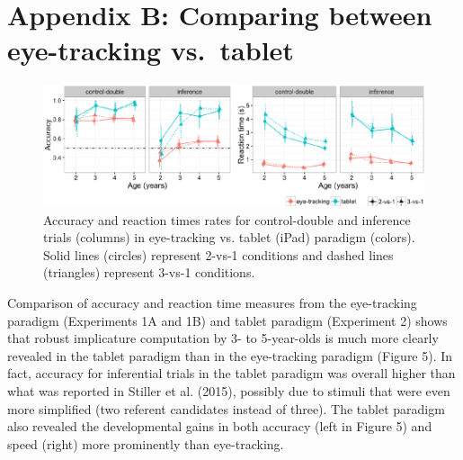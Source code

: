 \documentclass[a4paper,man,apacite,floatsintext]{apa6}
\newenvironment{CodeChunk}{}{}
\begin{document}
\section{Appendix B: Comparing between eye-tracking
vs.~tablet}\label{appendix-b-comparing-between-eye-tracking-vs.tablet}

\begin{CodeChunk}
\begin{figure}[H]

{\centering \includegraphics{figs/etip_compd-1} 

}

\caption[Accuracy and reaction times rates for control-double and inference trials (columns) in eye-tracking vs]{Accuracy and reaction times rates for control-double and inference trials (columns) in eye-tracking vs. tablet (iPad) paradigm (colors). Solid lines (circles) represent 2-vs-1 conditions and dashed lines (triangles) represent 3-vs-1 conditions.}\label{fig:etip_compd}
\end{figure}
\end{CodeChunk}

Comparison of accuracy and reaction time measures from the eye-tracking
paradigm (Experiments 1A and 1B) and tablet paradigm (Experiment 2)
shows that robust implicature computation by 3- to 5-year-olds is much
more clearly revealed in the tablet paradigm than in the eye-tracking
paradigm (Figure 5). In fact, accuracy for inferential trials in the
tablet paradigm was overall higher than what was reported in Stiller et
al. (2015), possibly due to stimuli that were even more simplified (two
referent candidates instead of three). The tablet paradigm also revealed
the developmental gains in both accuracy (left in Figure 5) and speed
(right) more prominently than eye-tracking.
\end{document}

